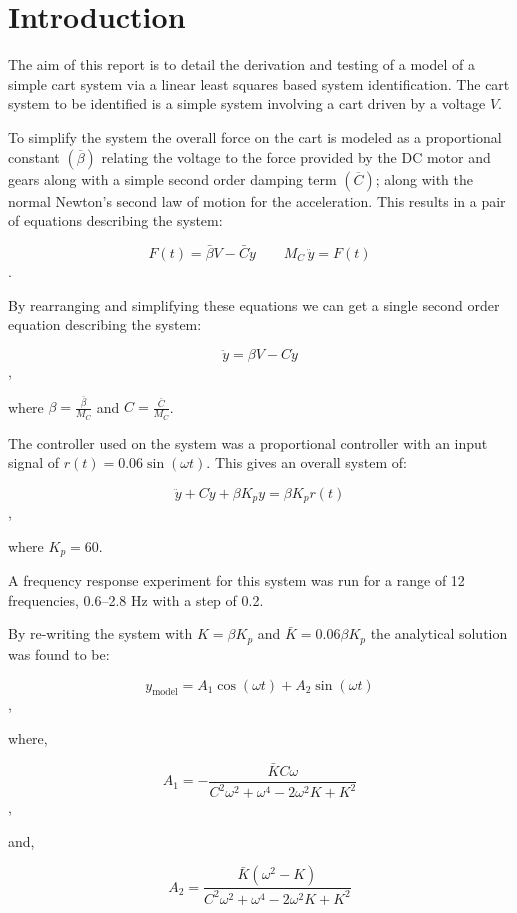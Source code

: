 \section*{Introduction}

The aim of this report is to detail the derivation and testing of a model of a
simple cart system via a linear least squares based system identification.  The
cart system to be identified is a simple system involving a cart driven by a
voltage $V$.  

To simplify the system the overall force on the cart is modeled as a
proportional constant $\left(\overline\beta\right)$ relating the voltage to the
force provided by the DC motor and gears along with a simple second order
damping term $\left(\overline{C}\right)$; along with the normal Newton's second
law of motion for the acceleration.  This results in a pair of equations
describing the system:

\begin{equation}
F\left(t\right) = \bar\beta V - \bar{C} \dot{y} \qquad M_C \, \ddot{y} = F\left(t\right)
\end{equation}.

By rearranging and simplifying these equations we can get a single second order
equation describing the system:

\begin{equation}
\ddot{y} = \beta V - C \dot{y}
\end{equation}, 

where $\beta = \frac{\bar\beta}{M_C}$ and $C = \frac{\bar{C}}{M_C}$.

The controller used on the system was a proportional controller with an input
signal of $r\left(t\right) = 0.06 \sin\left(\omega t\right)$.  This gives an
overall system of:

\begin{equation}
\ddot{y} + C \dot{y} + \beta K_p y = \beta K_p r\left(t\right)
\end{equation}, 

where $K_p = 60$.

A frequency response experiment for this system was run for a range of 12
frequencies, 0.6--2.8 Hz with a step of 0.2.

By re-writing the system with $K = \beta K_p$ and $\bar{K} = 0.06 \beta K_p$ the
analytical solution was found to be:

\begin{equation}
y_\text{model} = A_1 \cos\left(\omega t\right) + A_2 \sin\left(\omega t\right)
\end{equation}, 

where, 

\begin{equation}
A_1 = - \frac{\bar{K} C \omega}{C^2 \omega^2 + \omega^4 - 2 \omega^2 K + K^2}
\end{equation},

and,

\begin{equation}
A_2 = \frac{\bar{K} \left(\omega^2 - K\right)}{C^2 \omega^2 + \omega^4 - 2 \omega^2 K + K^2}
\end{equation}
